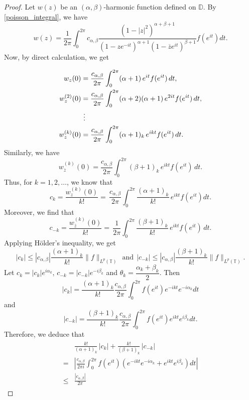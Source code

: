 \documentclass[11pt, reqno]{amsart}
\theoremstyle{definition}
\numberwithin{equation}{section}
\theoremstyle{remark}
\numberwithin{equation}{section}
\newcommand{\ID}{{\mathbb D}}
\begin{document}
\begin{proof}
	Let $w(z)$ be an $(\alpha,\beta)$-harmonic function defined on $\ID$. By \eqref{poisson_integral},
    we have
	\begin{equation}\label{47}
			w(z) = \frac{1}{2\pi} \int_0^{2\pi} c_{\alpha,\beta} \frac{\left(1 - |z|^2\right)^{\alpha + \beta + 1}}{(1 - z e^{-it})^{\alpha+1} (1 - \overline{z} e^{it})^{\beta+1}} f\left(e^{it}\right)dt.
	\end{equation}
	Now, by direct calculation, we get
	
	\begin{align*}
		w_{z}(0)
		&= \frac{c_{\alpha,\beta}}{2\pi}\int_{0}^{2\pi} (\alpha+1)\,e^{it} f(e^{it})\,dt,\\
		w_{ z}^{(2)}(0)
		&= \frac{c_{\alpha,\beta}}{2\pi}\int_{0}^{2\pi} (\alpha+2)(\alpha+1)\,e^{2it} f(e^{it})\,dt,\\ 
		&\ \vdots \notag\\
		w_{ z}^{(k)}(0)
		&= \frac{c_{\alpha,\beta}}{2\pi}\int_{0}^{2\pi} (\alpha+1)_{k}\, e^{ikt} f(e^{it})\,dt.
		\end{align*}
	Similarly, we have
	$$w_{ \overline{z}}^{(k)}(0)
	= \frac{c_{\alpha,\beta}}{2\pi}\int_{0}^{2\pi} (\beta+1)_{k}\, e^{ikt} f(e^{it})\,dt.
	$$
Thus, for \(k=1,2,\ldots\), we know that 
	$$
	c_k
	= \frac{w_z^{(k)}(0)}{k!}
	= \,
	\frac{c_{\alpha,\beta}}{2\pi}\int_{0}^{2\pi} \frac{(\alpha+1)_{k}}{k!}\,e^{ikt} f\left(e^{it}\right)dt.
	$$
	Moreover, we find that
	$$
	c_{-k}
	= \frac{w_{\bar z}^{(k)}(0)}{k!}
	= \,
	\frac{1}{2\pi}\int_{0}^{2\pi} \frac{(\beta+1)_{k}}{k!}\,e^{ikt} f\left(e^{it}\right)\,dt.
	$$
	Applying H\"older's inequality, we get
	$$|c_k|\leq |c_{\alpha,\beta}|\frac{(\alpha+1)_{k}}{k!}\|f\|_{L^p(\mathbb{T})}\ \ \text{and}\ \ |c_{-k}|\leq|c_{\alpha,\beta}|\frac{(\beta+1)_{k}}{k!}\|f\|_{L^p(\mathbb{T})}.$$
Let $c_k=|c_k|e^{i\alpha_k}$, $c_{-k}=|c_{-k}|e^{-i\beta_k}$ and $\theta_k=\dfrac{\alpha_k+\beta_k}{2}$. Then 
$$
|c_k|=\frac{(\alpha+1)_{k}}{ k!}\frac{c_{\alpha,\beta}}{2\pi}
\int_{0}^{2\pi}
f\left(e^{it}\right)e^{-ikt}e^{-i\alpha_k}dt$$ and
$$
|c_{-k}|=\frac{(\beta+1)_{k}}{ k!}
\frac{c_{\alpha,\beta}}{2\pi}\int_{0}^{2\pi}
f\left(e^{it}\right)e^{ikt}e^{i\beta_k}dt.
$$
Therefore, we deduce that
\begin{align*}
\begin{split}
	&\frac{ k!}{(\alpha+1)_{k}}\,|c_k|+ \frac{k!}{(\beta+1)_{k}}\,|c_{-k}|
	\\=&\left|
	\frac{c_{\alpha,\beta}}{2\pi i}\int_{0}^{2\pi}f\left(e^{it}\right) \left(e^{-ikt}e^{-i\alpha_k}+e^{ikt}e^{i\beta_k}\right)dt\right|\\ \leq&\frac{|c_{\alpha,\beta}|}{2\pi}

\end{split}
\end{align*}
\end{proof}
\end{document}
